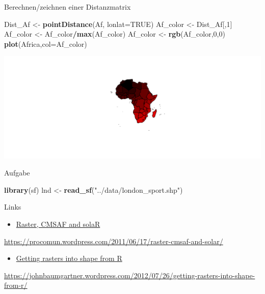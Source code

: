 \documentclass[ignorenonframetext,]{beamer}
\newenvironment{Shaded}{\begin{snugshade}}{\end{snugshade}}
\newcommand{\KeywordTok}[1]{\textcolor[rgb]{0.13,0.29,0.53}{\textbf{#1}}}
\newcommand{\DataTypeTok}[1]{\textcolor[rgb]{0.13,0.29,0.53}{#1}}
\newcommand{\DecValTok}[1]{\textcolor[rgb]{0.00,0.00,0.81}{#1}}
\newcommand{\StringTok}[1]{\textcolor[rgb]{0.31,0.60,0.02}{#1}}
\newcommand{\OtherTok}[1]{\textcolor[rgb]{0.56,0.35,0.01}{#1}}
\newcommand{\OperatorTok}[1]{\textcolor[rgb]{0.81,0.36,0.00}{\textbf{#1}}}
\newcommand{\NormalTok}[1]{#1}
\providecommand{\tightlist}{%
  \setlength{\itemsep}{0pt}\setlength{\parskip}{0pt}}
\begin{document}
\begin{frame}[fragile]{Berechnen/zeichnen einer Distanzmatrix}

\begin{Shaded}
\begin{Highlighting}[]
\NormalTok{Dist_Af <-}\StringTok{ }\KeywordTok{pointDistance}\NormalTok{(Af, }\DataTypeTok{lonlat=}\OtherTok{TRUE}\NormalTok{)}
\NormalTok{Af_color <-}\StringTok{ }\NormalTok{Dist_Af[,}\DecValTok{1}\NormalTok{]}
\NormalTok{Af_color <-}\StringTok{ }\NormalTok{Af_color}\OperatorTok{/}\KeywordTok{max}\NormalTok{(Af_color)}
\NormalTok{Af_color <-}\StringTok{ }\KeywordTok{rgb}\NormalTok{(Af_color,}\DecValTok{0}\NormalTok{,}\DecValTok{0}\NormalTok{)}
\KeywordTok{plot}\NormalTok{(Africa,}\DataTypeTok{col=}\NormalTok{Af_color)}
\end{Highlighting}
\end{Shaded}

\includegraphics{slides_all2gether_part1_files/figure-beamer/Africa Distance-1.pdf}

\end{frame}

\begin{frame}[fragile]{Aufgabe}

\begin{Shaded}
\begin{Highlighting}[]
\KeywordTok{library}\NormalTok{(sf)}
\NormalTok{lnd <-}\StringTok{ }\KeywordTok{read_sf}\NormalTok{(}\StringTok{"../data/london_sport.shp"}\NormalTok{)}
\end{Highlighting}
\end{Shaded}

\end{frame}

\begin{frame}{Links}

\begin{itemize}
\tightlist
\item
  \href{https://procomun.wordpress.com/2011/06/17/raster-cmsaf-and-solar/}{Raster,
  CMSAF and solaR}
\end{itemize}

\url{https://procomun.wordpress.com/2011/06/17/raster-cmsaf-and-solar/}

\begin{itemize}
\tightlist
\item
  \href{https://johnbaumgartner.wordpress.com/2012/07/26/getting-rasters-into-shape-from-r/}{Getting
  rasters into shape from R}
\end{itemize}

\url{https://johnbaumgartner.wordpress.com/2012/07/26/getting-rasters-into-shape-from-r/}

\end{frame}
\end{document}
